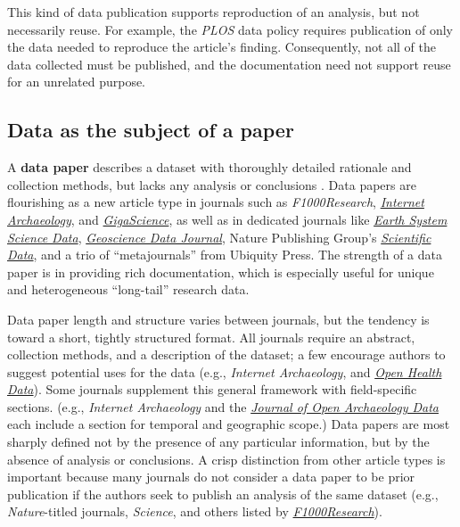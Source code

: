 \documentclass[10pt,a4paper,twocolumn]{article}
\begin{document}
{{This kind of data publication supports reproduction of an analysis, but not necessarily reuse.
For example, the \emph{PLOS} data policy requires publication of only the data needed to reproduce the article's finding.
Consequently, not all of the data collected must be published, and the documentation need not support reuse for an unrelated purpose.
 
\subsection*{Data as the subject of a paper}\label{paper-subject-data}

A \textbf{data paper} describes a dataset with thoroughly detailed rationale and collection methods, but lacks any analysis or conclusions \cite{newman_data_2009}.
Data papers are flourishing as a new article type in journals such as \emph{F1000Research}, \href{http://www.internetarchaeology.org/}{\emph{Internet Archaeology}}, and \href{http://www.gigasciencejournal.com/}{\emph{GigaScience}}, as well as in dedicated journals like \href{http://www.earth-system-science-data.net/}{\emph{Earth System Science Data}}\cite{pfeiffenberger_earth_2011}, \href{http://onlinelibrary.wiley.com/journal/10.1002/%28ISSN%292049-6060}{\emph{Geoscience Data Journal}}, Nature Publishing Group's \href{http://www.nature.com/scientificdata/}{\emph{Scientific Data}}, and a trio of ``metajournals'' from Ubiquity Press.
The strength of a data paper is in providing rich documentation, which is especially useful for unique and heterogeneous ``long-tail''\cite{heidorn_shedding_2008} research data.

Data paper length and structure varies between journals, but the tendency is toward a short, tightly structured format.
All journals require an abstract, collection methods, and a description of the dataset; a few encourage authors to suggest potential uses for the data (e.g., \emph{Internet Archaeology}, and \href{http://openhealthdata.metajnl.com/about/submissions#authorGuidelines}{\emph{Open Health Data}}).
Some journals supplement this general framework with field-specific sections. 
(e.g., \emph{Internet Archaeology} and the \href{http://openarchaeologydata.metajnl.com/}{\emph{Journal of Open Archaeology Data}} each include a section for temporal and geographic scope.)
Data papers are most sharply defined not by the presence of any particular information, but by the absence of analysis or conclusions.
A crisp distinction from other article types is important because many journals do not consider a data paper to be prior publication if the authors seek to publish an analysis of the same dataset (e.g., \textit{Nature}-titled journals, \emph{Science}, and others listed by \href{https://f1000research.com/data-policies}{\textit{F1000Research}}).

}}
\end{document}
